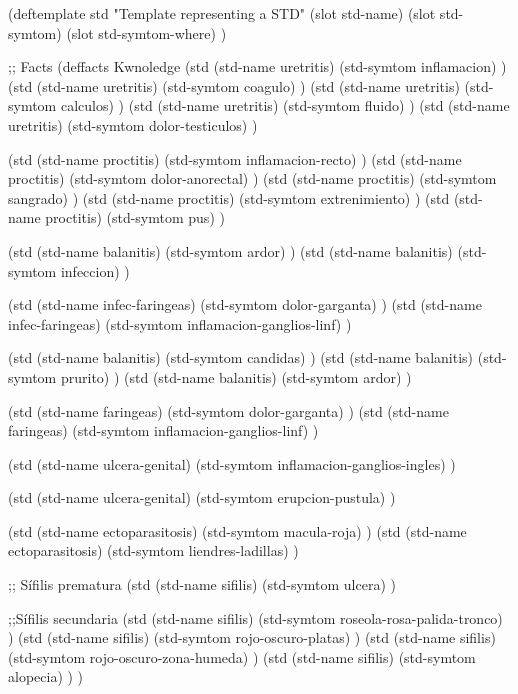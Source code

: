 \begin{newlispcode}
  (deftemplate std "Template representing a STD"
      (slot std-name)
      (slot std-symtom)
      (slot std-symtom-where)
  )

  ;; Facts
  (deffacts Kwnoledge
    (std
      (std-name uretritis) (std-symtom inflamacion) )
    (std
      (std-name uretritis) (std-symtom coagulo) )
    (std
      (std-name uretritis) (std-symtom calculos) )
    (std
      (std-name uretritis) (std-symtom fluido) )
    (std
      (std-name uretritis) (std-symtom dolor-testiculos) )

    (std
      (std-name proctitis) (std-symtom inflamacion-recto) )
    (std
      (std-name proctitis) (std-symtom dolor-anorectal) )
    (std
      (std-name proctitis) (std-symtom sangrado) )
    (std
      (std-name proctitis) (std-symtom extrenimiento) )
    (std
      (std-name proctitis) (std-symtom pus) )

    (std
      (std-name balanitis) (std-symtom ardor) )
    (std
      (std-name balanitis) (std-symtom infeccion) )

    (std
      (std-name infec-faringeas) (std-symtom dolor-garganta) )
    (std
      (std-name infec-faringeas) (std-symtom inflamacion-ganglios-linf) )

    (std
      (std-name balanitis) (std-symtom candidas) )
    (std
      (std-name balanitis) (std-symtom prurito) )
    (std
      (std-name balanitis) (std-symtom ardor) )

    (std
      (std-name faringeas) (std-symtom dolor-garganta) )
    (std
      (std-name faringeas) (std-symtom inflamacion-ganglios-linf) )

    (std
      (std-name ulcera-genital) (std-symtom inflamacion-ganglios-ingles) )

     (std
      (std-name ulcera-genital) (std-symtom erupcion-pustula) )

    (std
      (std-name ectoparasitosis) (std-symtom macula-roja) )
    (std
      (std-name ectoparasitosis) (std-symtom liendres-ladillas) )

    ;; Sífilis prematura
    (std
      (std-name sifilis) (std-symtom ulcera) )

    ;;Sífilis secundaria
    (std
      (std-name sifilis) (std-symtom roseola-rosa-palida-tronco) )
    (std
      (std-name sifilis) (std-symtom rojo-oscuro-platas) )
    (std
      (std-name sifilis) (std-symtom rojo-oscuro-zona-humeda) )
    (std
      (std-name sifilis) (std-symtom alopecia) )
  )
\end{newlispcode}


